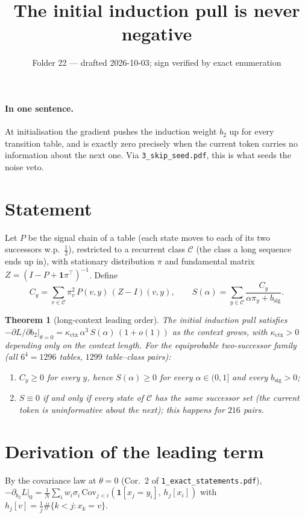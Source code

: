 \documentclass[11pt]{article}
\title{The initial induction pull is never negative}
\author{Folder 22 --- drafted 2026-10-03; sign verified by exact enumeration}
\date{}
\newtheorem{theorem}{Theorem}\newtheorem{lemma}{Lemma}
\theoremstyle{remark}\newtheorem{remark}{Remark}
\newcommand{\1}{\mathbf{1}}
\begin{document}
\maketitle

\paragraph{In one sentence.} At initialisation the gradient pushes the induction weight $b_2$ up for
every transition table, and is exactly zero precisely when the current token carries no information
about the next one. Via \texttt{3\_skip\_seed.pdf}, this is what seeds the noise veto.

\section{Statement}
Let $P$ be the signal chain of a table (each state moves to each of its two successors w.p.\ $\tfrac12$),
restricted to a recurrent class $\mathcal C$ (the class a long sequence ends up in), with stationary
distribution $\pi$ and fundamental matrix $Z=(I-P+\mathbf 1\pi^\top)^{-1}$. Define
\[
C_y=\sum_{v\in\mathcal C}\pi_v^2\,P(v,y)\,(Z-I)(v,y),\qquad
S(\alpha)=\sum_{y\in\mathcal C}\frac{C_y}{\alpha\pi_y+b_{\mathrm{sig}}}.
\]
\begin{theorem}[long-context leading order]
The initial induction pull satisfies $-\partial L/\partial b_2|_{\theta=0}=\kappa_{\mathrm{ctx}}\,\alpha^3\,S(\alpha)\,(1+o(1))$
as the context grows, with $\kappa_{\mathrm{ctx}}>0$ depending only on the context length. For the
equiprobable two-successor family (all $6^4=1296$ tables, $1299$ table--class pairs):
\begin{enumerate}
\item $C_y\ge0$ for every $y$, hence $S(\alpha)\ge0$ for every $\alpha\in(0,1]$ and every $b_{\mathrm{sig}}>0$;
\item $S\equiv0$ if and only if every state of $\mathcal C$ has the same successor set (the current
token is uninformative about the next); this happens for $216$ pairs.
\end{enumerate}
\end{theorem}

\section{Derivation of the leading term}
By the covariance law at $\theta=0$ (Cor.~2 of \texttt{1\_exact\_statements.pdf}),
$-\partial_{b_2}L|_0=\frac1N\sum_iw_i\sigma_i\,\mathrm{Cov}_{j<i}(\1[x_j=y_i],\,h_j[x_i])$ with
$h_j[v]=\frac1j\#\{k<j:x_k=v\}$.
\end{document}
